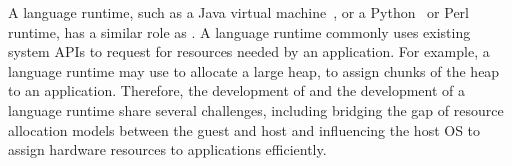 A language runtime, such as a Java virtual machine~\cite{hotspot,j9,alpern2000jalapeno}, or a Python~\cite{python} or Perl~\cite{perl} runtime,
has a similar role as \thelibos{}.
A language runtime commonly uses existing system APIs to request for resources needed by an application.
For example, a language runtime may use  to allocate a large heap,
to assign chunks of the heap to an application.
Therefore, the development of \thelibos{} and the development of a language runtime share
several challenges,
including bridging the gap of resource allocation models
between the guest and host
and influencing the host OS to assign hardware resources to applications efficiently.


